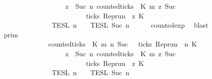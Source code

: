 \begin{isabellebody}
\ \ \ \ \ \ \ \ \ \ \ \ \ \ \ \ \ \ \ \ \ \ {\isasymand}\ {\isacharparenleft}{\isasymforall}z\ {\isasymge}\ Suc\ n{\isachardot}\ {\isacharparenleft}counted{\isacharunderscore}ticks\ {\isasymrho}\ K\ m\ z\ {\isacharparenleft}Suc\ {}{\isacharparenright}{\isacharparenright}\isanewline
\ \ \ \ \ \ \ \ \ \ \ \ \ \ \ \ \ \ \ \ \ \ \ \ \ \ \ \ {\isasymlongrightarrow}\ ticks\ {\isacharparenleft}{\isacharparenleft}Rep{\isacharunderscore}run\ {\isasymrho}{\isacharparenright}\ z\ K\ {\isacharbraceright}\isanewline
\ \ \ \ \ \ \ \ \ \ \ \ \ \ \ \ {\isasyminter}\ {\isasymlbrakk}{\isasymlbrakk}\ {\isasymPsi}\ {\isasymrbrakk}{\isasymrbrakk}\isactrlsub T\isactrlsub E\isactrlsub S\isactrlsub L\isactrlbsup {\isasymge}\ n\isactrlesup \ {\isasyminter}\ {\isasymlbrakk}{\isasymlbrakk}\ {\isasymPhi}\ {\isasymrbrakk}{\isasymrbrakk}\isactrlsub T\isactrlsub E\isactrlsub S\isactrlsub L\isactrlbsup {\isasymge}\ Suc\ n\isactrlesup {\isacartoucheclose}\isanewline
\ \ \ \ \isamarkupfalse%
\ counted{\isacharunderscore}exp\ \isamarkupfalse%
\ blast\isanewline
\ \ \isamarkupfalse%
\ \isamarkupfalse%
\ {\isacartoucheopen}{\isachardot}{\isachardot}{\isachardot}\ {\isacharequal}\ {\isasymlbrakk}{\isasymlbrakk}\ {\isasymGamma}\ {\isasymrbrakk}{\isasymrbrakk}\isactrlsub p\isactrlsub r\isactrlsub i\isactrlsub m\ \isanewline
\ \ \ \ \ \ \ \ \ \ \ \ \ \ \ \ {\isasyminter}\ {\isacharbraceleft}{\isasymrho}{\isachardot}\ {\isacharparenleft}{\isasymnot}counted{\isacharunderscore}ticks\ {\isasymrho}\ K\ m\ n\ {\isacharparenleft}Suc\ {}{\isacharparenright}\ {\isasymor}\ ticks\ {\isacharparenleft}{\isacharparenleft}Rep{\isacharunderscore}run\ {\isasymrho}{\isacharparenright}\ n\ K\isanewline
\ \ \ \ \ \ \ \ \ \ \ \ \ \ \ \ \ \ \ \ \ \ {\isasymand}\ {\isacharparenleft}{\isasymforall}z\ {\isasymge}\ Suc\ n{\isachardot}\ {\isacharparenleft}counted{\isacharunderscore}ticks\ {\isasymrho}\ K\ m\ z\ {\isacharparenleft}Suc\ {}{\isacharparenright}{\isacharparenright}\isanewline
\ \ \ \ \ \ \ \ \ \ \ \ \ \ \ \ \ \ \ \ \ \ \ \ \ \ \ \ {\isasymlongrightarrow}\ ticks\ {\isacharparenleft}{\isacharparenleft}Rep{\isacharunderscore}run\ {\isasymrho}{\isacharparenright}\ z\ K\ {\isacharbraceright}\isanewline
\ \ \ \ \ \ \ \ \ \ \ \ \ \ \ \ {\isasyminter}\ {\isasymlbrakk}{\isasymlbrakk}\ {\isasymPsi}\ {\isasymrbrakk}{\isasymrbrakk}\isactrlsub T\isactrlsub E\isactrlsub S\isactrlsub L\isactrlbsup {\isasymge}\ n\isactrlesup \ {\isasyminter}\ {\isasymlbrakk}{\isasymlbrakk}\ {\isasymPhi}\ {\isasymrbrakk}{\isasymrbrakk}\isactrlsub T\isactrlsub E\isactrlsub S\isactrlsub L\isactrlbsup {\isasymge}\ Suc\ n\isactrlesup {\isacartoucheclose}\isanewline

\end{isabellebody}
